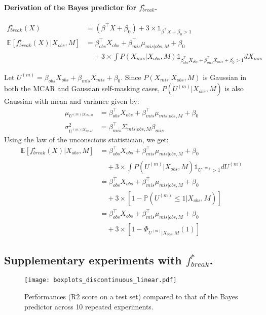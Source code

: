\documentclass{article}
\newcommand{\E}{\mathbb{E}}
\newcommand{\br}[1]{\left(#1\right)}
\newcommand{\sqb}[1]{\left[#1\right]}
\theoremstyle{plain}
\begin{document}
\paragraph{Derivation of the Bayes predictor for $f^\star_{break}$.}
\begin{align}
    f^\star_{break}(X) &= \br{\beta^\top X + \beta_0} + 3 \times \mathds{1}_{\beta^\top X + \beta_0 > 1}\\
    \E \sqb{f^\star_{break}(X) | X_{obs}, M} &= \beta_{obs}^\top X_{obs} + \beta_{mis}^\top \mu_{mis|obs, M} + \beta_0\\
    & \quad + 3 \times \int P(X_{mis}|X_{obs}, M) \mathds{1}_{\beta_{obs}^\top X_{obs} + \beta_{mis}^\top X_{mis} + \beta_0 > 1} dX_{mis}
\end{align}

Let $U^{(m)} = \beta_{obs} X_{obs} + \beta_{mis} X_{mis} + \beta_0$. Since $P(X_{mis}|X_{obs}, M)$ is Gaussian in both the MCAR and Gaussian self-masking cases, $P(U^{(m)}|X_{obs}, M)$ is also Gaussian with mean and variance given by:
\begin{align}
    \mu_{U^{(m)|X_{obs, M}}} &= \beta_{obs}^\top X_{obs} + \beta_{mis}^\top \mu_{mis|obs, M} +\beta_0\\
    \sigma^2_{U^{(m)|X_{obs, M}}} &= \beta_{mis}^\top  \Sigma_{mis|obs, M} \beta_{mis}
\end{align}
Using the law of the unconscious statistician, we get:
\begin{align}
    \E \sqb{f^\star_{break}(X) | X_{obs}, M} &= \beta_{obs}^\top X_{obs} + \beta_{mis}^\top \mu_{mis|obs, M} + \beta_0\\
    & \quad + 3 \times \int P(U^{(m)}|X_{obs}, M) \mathds{1}_{U^{(m)} > 1} dU^{(m)}\\
    &= \beta_{obs}^\top X_{obs} + \beta_{mis}^\top \mu_{mis|obs, M} + \beta_0\\
    & \quad + 3 \times \sqb{1- \mathbb{P}\br{U^{(m)} \leq 1 | X_{obs}, M}}\\
    &= \beta_{obs}^\top X_{obs} + \beta_{mis}^\top \mu_{mis|obs, M} + \beta_0\\
    & \quad + 3 \times \sqb{1- \Phi_{U^{(m)}|X_{obs}, M} (1)}
\end{align}


\subsection{Supplementary experiments with $f^*_{break}$.}
\label{ss:boxplots_discontinuous_linear}
\begin{figure}[h]
    \centering
    \texttt{[image: boxplots\_discontinuous\_linear.pdf]}
    \caption{Performances (R2 score on a test set) compared to that of the Bayes predictor across 10 repeated experiments.}
    \label{fig:boxplots_discontinuous_linear}
\end{figure}
\end{document}
